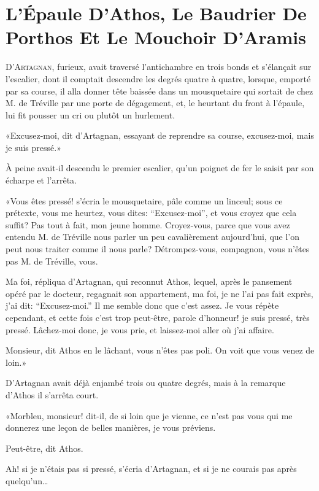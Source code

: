 
\chapter[L'Épaule, Le Baudrier Et Le Mouchoir]{L'Épaule D'Athos, Le Baudrier De Porthos Et Le Mouchoir D'Aramis} 
	
\lettrine{D}{'Artagnan}, furieux, avait traversé l'antichambre en trois bonds et s'élançait sur l'escalier, dont il comptait descendre les degrés quatre à quatre, lorsque, emporté par sa course, il alla donner tête baissée dans un mousquetaire qui sortait de chez M. de Tréville par une porte de dégagement, et, le heurtant du front à l'épaule, lui fit pousser un cri ou plutôt un hurlement. 

«Excusez-moi, dit d'Artagnan, essayant de reprendre sa course, excusez-moi, mais je suis pressé.» 

À peine avait-il descendu le premier escalier, qu'un poignet de fer le saisit par son écharpe et l'arrêta. 

«Vous êtes pressé! s'écria le mousquetaire, pâle comme un linceul; sous ce prétexte, vous me heurtez, vous dites: “Excusez-moi”, et vous croyez que cela suffit? Pas tout à fait, mon jeune homme. Croyez-vous, parce que vous avez entendu M. de Tréville nous parler un peu cavalièrement aujourd'hui, que l'on peut nous traiter comme il nous parle? Détrompez-vous, compagnon, vous n'êtes pas M. de Tréville, vous. 

\speak  Ma foi, répliqua d'Artagnan, qui reconnut Athos, lequel, après le pansement opéré par le docteur, regagnait son appartement, ma foi, je ne l'ai pas fait exprès, j'ai dit: “Excusez-moi.” Il me semble donc que c'est assez. Je vous répète cependant, et cette fois c'est trop peut-être, parole d'honneur! je suis pressé, très pressé. Lâchez-moi donc, je vous prie, et laissez-moi aller où j'ai affaire. 

\speak  Monsieur, dit Athos en le lâchant, vous n'êtes pas poli. On voit que vous venez de loin.» 

D'Artagnan avait déjà enjambé trois ou quatre degrés, mais à la remarque d'Athos il s'arrêta court. 

«Morbleu, monsieur! dit-il, de si loin que je vienne, ce n'est pas vous qui me donnerez une leçon de belles manières, je vous préviens. 

\speak  Peut-être, dit Athos. 

\speak  Ah! si je n'étais pas si pressé, s'écria d'Artagnan, et si je ne courais pas après quelqu'un\dots 


